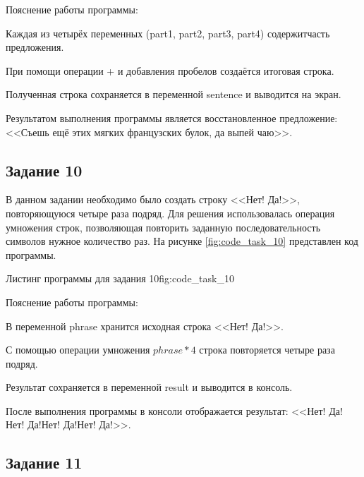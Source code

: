 \documentclass[]{vvsu}
\begin{document}
Пояснение работы программы:
\begin{vvsu_list}
  \item Каждая из четырёх переменных (part1, part2, part3, part4) содержит\linebreak часть предложения.
  \item При помощи операции + и добавления пробелов создаётся итоговая строка.
  \item Полученная строка сохраняется в переменной sentence и выводится на экран.
\end{vvsu_list}

Результатом выполнения программы является восстановленное предложение:
<<Съешь ещё этих мягких французских булок, да выпей чаю>>.

\subsection{Задание 10}

В данном задании необходимо было создать строку <<Нет! Да!>>, повторяющуюся четыре раза подряд.  
Для решения использовалась операция умножения строк, позволяющая повторить заданную последовательность символов нужное количество раз.  
На рисунке \ref{fig:code_task_10} представлен код программы.

\begin{vvsu_figure}{Листинг программы для задания 10}{fig:code_task_10}
  \begin{minipage}{.75\textwidth}
    
  \end{minipage}
\end{vvsu_figure}

Пояснение работы программы:
\begin{vvsu_list}
  \item В переменной phrase хранится исходная строка <<Нет! Да!>>.
  \item С помощью операции умножения $phrase * 4$ строка повторяется четыре раза подряд.
  \item Результат сохраняется в переменной result и выводится в консоль.
\end{vvsu_list}

После выполнения программы в консоли отображается результат:  
<<Нет! Да!Нет! Да!Нет! Да!Нет! Да!>>.

\subsection{Задание 11}
\end{document}
